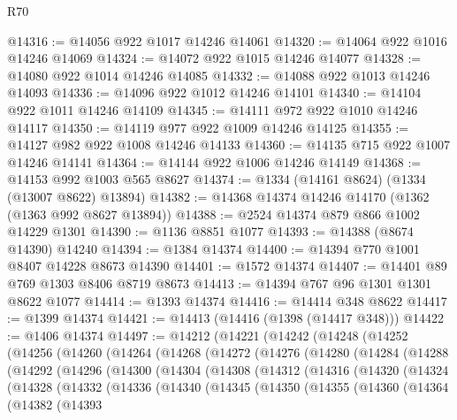 \begin{lexlean}{R70}
\begin{coremodule}
@14316 := @14056 @922 @1017 @14246 @14061
@14320 := @14064 @922 @1016 @14246 @14069
@14324 := @14072 @922 @1015 @14246 @14077
@14328 := @14080 @922 @1014 @14246 @14085
@14332 := @14088 @922 @1013 @14246 @14093
@14336 := @14096 @922 @1012 @14246 @14101
@14340 := @14104 @922 @1011 @14246 @14109
@14345 := @14111 @972 @922 @1010 @14246 @14117
@14350 := @14119 @977 @922 @1009 @14246 @14125
@14355 := @14127 @982 @922 @1008 @14246 @14133
@14360 := @14135 @715 @922 @1007 @14246 @14141
@14364 := @14144 @922 @1006 @14246 @14149
@14368 := @14153 @992 @1003 @565 @8627
@14374 := @1334 (@14161 @8624) (@1334 (@13007 @8622) @13894)
@14382 := @14368 @14374 @14246 @14170 (@1362 (@1363 @992 @8627 @13894))
@14388 := @2524 @14374 @879 @866 @1002 @14229 @1301
@14390 := @1136 @8851 @1077
@14393 := @14388 (@8674 @14390) @14240
@14394 := @1384 @14374
@14400 := @14394 @770 @1001 @8407 @14228 @8673 @14390
@14401 := @1572 @14374
@14407 := @14401 @89 @769 @1303 @8406 @8719 @8673
@14413 := @14394 @767 @96 @1301 @1301 @8622 @1077
@14414 := @1393 @14374
@14416 := @14414 @348 @8622
@14417 := @1399 @14374
@14421 := @14413 (@14416 (@1398 (@14417 @348)))
@14422 := @1406 @14374
@14497 := @14212
    (@14221
      (@14242
        (@14248
          (@14252
            (@14256
              (@14260
                (@14264
                  (@14268
                    (@14272
                      (@14276
                        (@14280
                          (@14284
                            (@14288
                              (@14292
                                (@14296
                                  (@14300
                                    (@14304
                                      (@14308
                                        (@14312
                                          (@14316
                                            (@14320
                                              (@14324
                                                (@14328
                                                  (@14332
                                                    (@14336
                                                      (@14340
                                                        (@14345
                                                          (@14350
                                                            (@14355
                                                              (@14360
                                                                (@14364
                                                                  (@14382
                                                                    (@14393

\end{coremodule}
\end{lexlean}
